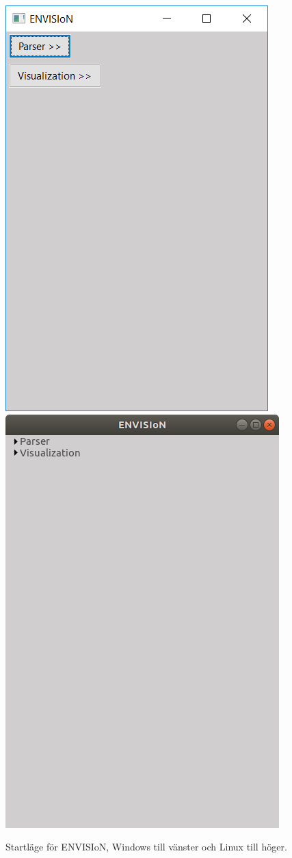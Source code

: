 \begin{figure}[H]
  \centering
    \includegraphics[scale=0.5]{images/GUI/GUIBasWin.png}
    \includegraphics[scale=0.49]{images/GUI/GUIBasLinux.png}
    \caption{Startläge för ENVISIoN, Windows till vänster och Linux till höger.}
    \label{fig:Startup}
\end{figure}

